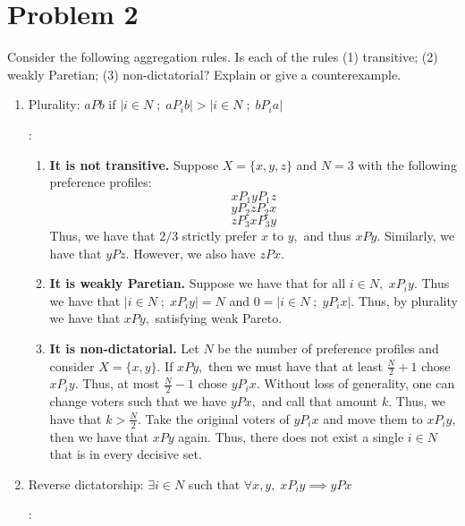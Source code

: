 \documentclass[11pt]{article}
\begin{document}
\newpage
\section*{Problem 2}
\begin{problem}
    Consider the following aggregation rules. Is each of the rules (1) transitive; (2) weakly Paretian; (3) non-dictatorial? Explain or give a counterexample.
\end{problem}
\begin{enumerate}
    \item 
    \begin{problem}
        Plurality: $aPb$ if $|i \in N \; ; \; aP_ib|> |i \in N \; ; \; bP_ia|$
    \end{problem}
    \begin{solution}:\\
        \begin{enumerate}
            \item \textbf{It is not transitive.} Suppose $X = \{x,y,z\}$ and $N=3$ with the following preference profiles:
            \[xP_1yP_1z\]
            \[yP_2zP_2x\]
            \[zP_3xP_3y\]
            Thus, we have that $2/3$ strictly prefer $x$ to $y,$ and thus $xPy.$ Similarly, we have that $yPz.$ However, we also have $zPx.$
        \item \textbf{It is weakly Paretian.} Suppose we have that for all $i\in N,$ $xP_iy.$ Thus we have that $|i \in N \; ; \; xP_i y| = N$ and $0 = |i \in N \; ; \; yP_i x|.$ Thus, by plurality we have that $xPy,$ satisfying weak Pareto.
        \item \textbf{It is non-dictatorial.} Let $N$ be the number of preference profiles and consider $X = \{x,y\}.$ If $xPy,$ then we must have that at least $\frac{N}{2} + 1$ chose $xP_iy.$ Thus, at most $\frac{N}{2} -1$ chose $yP_ix.$ Without loss of generality, one can change voters such that we have $yPx,$ and call that amount $k.$ Thus, we have that $k>\frac{N}{2}.$ Take the original voters of $yP_ix$ and move them to $xP_iy,$ then we have that $xPy$ again. Thus, there does not exist a single $i \in N$ that is in every decisive set. 
        \end{enumerate}
    \end{solution}
    \item 
    \begin{problem}
        Reverse dictatorship: 
        $\exists i \in N$ such that $\forall x,y, \; xP_iy \implies yPx$
    \end{problem}
    \begin{solution}:\\

\end{solution}
\end{enumerate}
\end{document}
